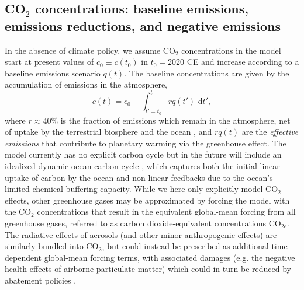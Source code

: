 \documentclass{article}
\begin{document}
\subsection{CO$_{2}$ concentrations: baseline emissions, emissions reductions, and negative emissions}

In the absence of climate policy, we assume CO$_{2}$ concentrations in the model start at present values of $c_{0} \equiv c(t_{0})$ in $t_{0}=2020$ CE and increase according to a baseline emissions scenario $q(t)$. The baseline concentrations are given by the accumulation of emissions in the atmosphere,
\begin{equation}
c(t) = c_{0} + \int_{t'=t_{0}}^{t} rq(t') \text{ d}t',
\end{equation}
where $r \approx 40\%$ is the fraction of emissions which remain in the atmosphere, net of uptake by the terrestrial biosphere and the ocean \citep{solomon_irreversible_2009}, and $rq(t)$ are the \textit{effective emissions} that contribute to planetary warming via the greenhouse effect. The model currently has no explicit carbon cycle but in the future will include an idealized dynamic ocean carbon cycle \citep{glotter_simple_2014}, which captures both the initial linear uptake of carbon by the ocean and non-linear feedbacks due to the ocean's limited chemical buffering capacity. While we here only explicitly model CO$_{2}$ effects, other greenhouse gases may be approximated by forcing the model with the CO$_{2}$ concentrations that result in the equivalent global-mean forcing from all greenhouse gases, referred to as carbon dioxide-equivalent concentrations CO$_{2e}$. The radiative effects of aerosols (and other minor anthropogenic effects) are similarly bundled into CO$_{2e}$ but could instead be prescribed as additional time-dependent global-mean forcing terms, with associated damages (e.g. the negative health effects of airborne particulate matter) which could in turn be reduced by abatement policies \citep{thompson_systems_2014}.
\end{document}
